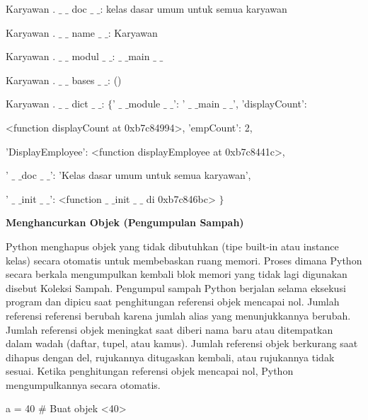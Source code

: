 \vspace{12pt}
\noindent 
Karyawan . $  \_  $ $  \_  $ doc $  \_  $ $  \_  $: kelas dasar umum untuk semua karyawan \par
\noindent 
Karyawan . $  \_  $ $  \_  $ name $  \_  $ $  \_  $: Karyawan \par
\noindent 
Karyawan . $  \_  $ $  \_  $ modul $  \_  $ $  \_  $:  $  \_  $ $  \_  $main $  \_  $ $  \_  $ \par
\noindent 
Karyawan . $  \_  $ $  \_  $ bases $  \_  $ $  \_  $: () \par
\noindent 
Karyawan . $  \_  $ $  \_  $ dict $  \_  $ $  \_  $:  $  \{  $' $  \_  $ $  \_  $module $  \_  $ $  \_  $': ' $  \_  $ $  \_  $main $  \_  $ $  \_  $', 'displayCount': \par
\noindent 
<function displayCount at 0xb7c84994>, 'empCount': 2, \par
\noindent 
'DisplayEmployee': <function displayEmployee at 0xb7c8441c>, \par
\noindent 
' $  \_  $ $  \_  $doc $  \_  $ $  \_  $': 'Kelas dasar umum untuk semua karyawan', \par
\noindent 
' $  \_  $ $  \_  $init $  \_  $ $  \_  $': <function  $  \_  $ $  \_  $init $  \_  $ $  \_  $ di 0xb7c846bc> $  \}  $ \par
\vspace{12pt}
\noindent 
{\fontsize{14pt}{14pt}\selectfont \textbf{Menghancurkan Objek (Pengumpulan Sampah)} \\} \par
\vspace{12pt}
Python menghapus objek yang tidak dibutuhkan (tipe built-in atau instance kelas) secara otomatis untuk membebaskan ruang memori. Proses dimana Python secara berkala mengumpulkan kembali blok memori yang tidak lagi digunakan disebut Koleksi Sampah. Pengumpul sampah Python berjalan selama eksekusi program dan dipicu saat penghitungan referensi objek mencapai nol. Jumlah referensi referensi berubah karena jumlah alias yang menunjukkannya berubah. Jumlah referensi objek meningkat saat diberi nama baru atau ditempatkan dalam wadah (daftar, tupel, atau kamus). Jumlah referensi objek berkurang saat dihapus dengan del, rujukannya ditugaskan kembali, atau rujukannya tidak sesuai. Ketika penghitungan referensi objek mencapai nol, Python mengumpulkannya secara otomatis. \par
\vspace{12pt}
\noindent 
a = 40  $  \#  $ Buat objek <40> \par
\noindent 
